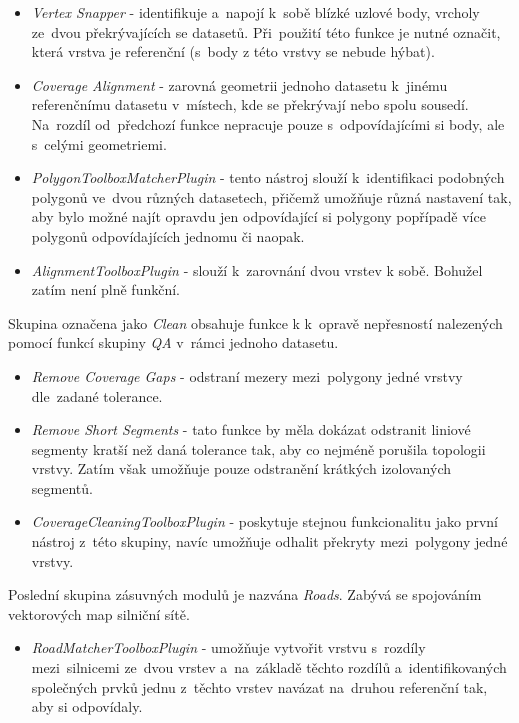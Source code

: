 \begin{itemize}[leftmargin=*]
 \item \textit{Vertex Snapper} - identifikuje a~napojí k~sobě blízké uzlové body, vrcholy ze~dvou překrývajících se datasetů. Při~použití této funkce je nutné označit, 
	která vrstva je referenční (s~body z této vrstvy se nebude hýbat).
 \item \textit{Coverage Alignment} - zarovná geometrii jednoho datasetu k~jinému referenčnímu datasetu v~místech, kde se překrývají nebo spolu sousedí. Na~rozdíl 
	od~předchozí funkce nepracuje pouze s~odpovídajícími si body, ale s~celými geometriemi.
 \item \textit{PolygonToolboxMatcherPlugin} - tento nástroj slouží k~identifikaci podobných polygonů ve~dvou různých datasetech, přičemž umožňuje různá nastavení tak, 
	aby bylo možné najít opravdu jen odpovídající si polygony popřípadě více polygonů odpovídajících jednomu či naopak. %
 \item \textit{AlignmentToolboxPlugin} - slouží k~zarovnání dvou vrstev k sobě. Bohužel zatím není plně funkční. %
\end{itemize}

Skupina označena jako \textit{Clean} obsahuje funkce k k~opravě nepřesností nalezených pomocí funkcí skupiny \textit{QA} v~rámci jednoho datasetu.

\begin{itemize}[leftmargin=*]
 \item \textit{Remove Coverage Gaps} - odstraní mezery mezi~polygony jedné vrstvy dle~zadané tolerance.
 \item \textit{Remove Short Segments} - tato funkce by měla dokázat odstranit liniové segmenty kratší než daná tolerance tak, aby co nejméně porušila topologii vrstvy. 
      Zatím však umožňuje pouze odstranění krátkých izolovaných segmentů.
 \item \textit{CoverageCleaningToolboxPlugin} - poskytuje stejnou funkcionalitu jako první nástroj z~této skupiny, navíc umožňuje odhalit překryty mezi~polygony jedné vrstvy.
\end{itemize}

Poslední skupina zásuvných modulů je nazvána \textit{Roads}. Zabývá se spojováním vektorových map silniční sítě.

\begin{itemize}[leftmargin=*]
 \item \textit{RoadMatcherToolboxPlugin} - umožňuje vytvořit vrstvu s~rozdíly mezi~silnicemi ze~dvou vrstev a~na~základě těchto rozdílů a~identifikovaných společných prvků 
	jednu z~těchto vrstev navázat na~druhou referenční tak, aby si odpovídaly.
\end{itemize}


